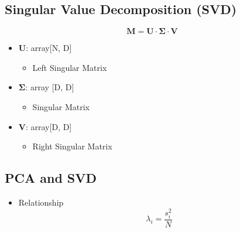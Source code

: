\documentclass[11pt]{article}
\providecommand{\tightlist}{%
      \setlength{\itemsep}{0pt}\setlength{\parskip}{0pt}}
\begin{document}
    \hypertarget{singular-value-decomposition-svd}{%
\subsection{Singular Value Decomposition
(SVD)}\label{singular-value-decomposition-svd}}

\[
\mathbf{M} = \mathbf{U} \cdot \mathbf{\Sigma} \cdot \mathbf{V}
\]

\begin{itemize}
\tightlist
\item
  \(\mathbf{U}\): array{[}N, D{]}

  \begin{itemize}
  \tightlist
  \item
    Left Singular Matrix
  \end{itemize}
\item
  \(\mathbf{\Sigma}\): array {[}D, D{]}

  \begin{itemize}
  \tightlist
  \item
    Singular Matrix
  \end{itemize}
\item
  \(\mathbf{V}\): array{[}D, D{]}

  \begin{itemize}
  \tightlist
  \item
    Right Singular Matrix
  \end{itemize}
\end{itemize}

    \hypertarget{pca-and-svd}{%
\subsection{PCA and SVD}\label{pca-and-svd}}

\begin{itemize}
\tightlist
\item
  Relationship \[\lambda_i = \frac{s_i^2}{N}\]
\end{itemize}
\end{document}
